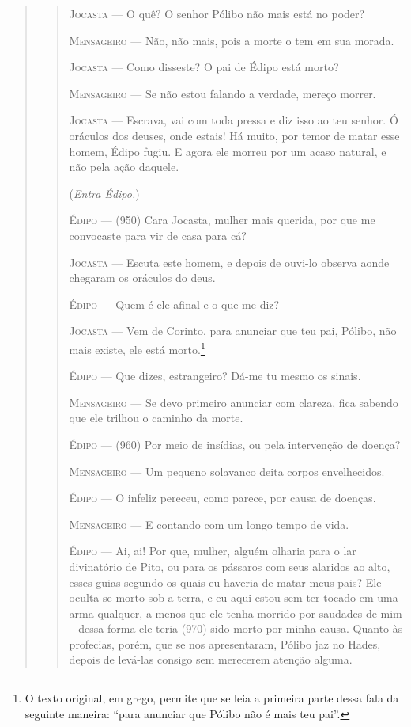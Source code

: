 \begin{verse}
\begin{verse}
\textsc{Jocasta} --- O quê? O senhor Pólibo não mais está no poder?

\textsc{Mensageiro} --- Não, não mais, pois a morte o tem em sua morada.

\textsc{Jocasta} --- Como disseste? O pai de Édipo está morto?

\textsc{Mensageiro} --- Se não estou falando a verdade, mereço morrer.

\textsc{Jocasta} --- Escrava, vai com toda pressa e diz isso ao teu senhor. Ó oráculos dos
deuses, onde estais! Há muito, por temor de matar esse homem, Édipo
fugiu. E agora ele morreu por um acaso natural, e não pela ação daquele.

(\emph{Entra Édipo.})

\textsc{Édipo} --- (950) Cara Jocasta, mulher mais querida, por que me convocaste para vir
de casa para cá?

\textsc{Jocasta} --- Escuta este homem, e depois de ouvi-lo observa aonde chegaram os
oráculos do deus.

\textsc{Édipo} --- Quem é ele afinal e o que me diz?

\textsc{Jocasta} --- Vem de Corinto, para anunciar que teu pai, Pólibo, não mais existe, ele
está morto.\footnote{O texto original, em grego, permite que se leia a
  primeira parte dessa fala da seguinte maneira: ``para anunciar
  que Pólibo não é mais teu pai''.}

\textsc{Édipo} --- Que dizes, estrangeiro? Dá-me tu mesmo os sinais.

\textsc{Mensageiro} --- Se devo primeiro anunciar com clareza, fica sabendo que ele trilhou o
caminho da morte.

\textsc{Édipo} --- (960) Por meio de insídias, ou pela intervenção de doença?

\textsc{Mensageiro} --- Um pequeno solavanco deita corpos envelhecidos.

\textsc{Édipo} --- O infeliz pereceu, como parece, por causa de doenças.

\textsc{Mensageiro} --- E contando com um longo tempo de vida.

\textsc{Édipo} --- Ai, ai! Por que, mulher, alguém olharia para o lar divinatório de Pito,
ou para os pássaros com seus alaridos ao alto, esses guias segundo os
quais eu haveria de matar meus pais? Ele oculta-se morto sob a terra, e
eu aqui estou sem ter tocado em uma arma qualquer, a menos que ele tenha
morrido por saudades de mim -- dessa forma ele teria (970) sido morto por
minha causa. Quanto às profecias, porém, que se nos apresentaram, Pólibo
jaz no Hades, depois de levá-las consigo sem merecerem atenção alguma.


\end{verse}
\end{verse}
